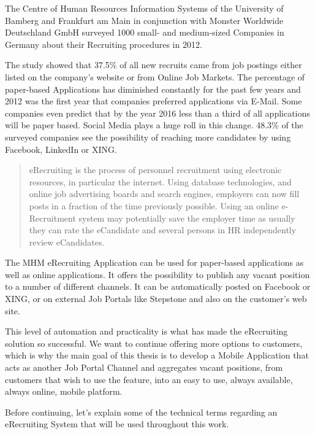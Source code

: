 The Centre of Human Resources Information Systems of the University of Bamberg and Frankfurt am Main in conjunction with Monster Worldwide Deutschland GmbH surveyed 1000 small- and medium-sized Companies in Germany about their Recruiting procedures in 2012.\cite[p. 6]{weitzel:2012}

The study showed that 37.5\% of all new recruits came from job postings either listed on the company's website or from Online Job Markets. The percentage of paper-based Applications has diminished constantly for the past few years and 2012 was the first year that companies preferred applications via E-Mail. Some companies even predict that by the year 2016 less than a third of all applications will be paper based. Social Media plays a huge roll in this change. 48.3\% of the surveyed companies see the possibility of reaching more candidates by using Facebook, LinkedIn or XING.\cite[p. 8]{weitzel:2012}


\begin{quotation}
eRecruiting is the process of personnel recruitment using electronic resources, in particular the internet. Using database technologies, and online job advertising boards and search engines, employers can now fill posts in a fraction of the time previously possible. Using an online e-Recruitment system may potentially save the employer time as usually they can rate the eCandidate and several persons in HR independently review eCandidates.
\cite{wikipedia:erec}

\end{quotation}


The MHM eRecruiting Application can be used for paper-based applications as well as online applications. It offers the possibility to publish any vacant position to a number of different channels. It can be automatically posted on Facebook or XING, or on external Job Portals like Stepstone and also on the customer's web site.

This level of automation and practicality is what has made the eRecruiting solution so successful. We want to continue offering more options to customers, which is why the main goal of this thesis is to develop a Mobile Application that acts as another Job Portal Channel and aggregates vacant positions, from customers that wish to use the feature, into an easy to use, always available, always online, mobile platform. %

Before continuing, let's explain some of the technical terms regarding an eRecruiting System that will be used throughout this work.

